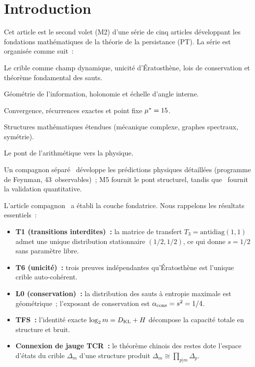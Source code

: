 \documentclass[12pt,a4paper]{article}
\begin{document}
\tableofcontents
\newpage

\section{Introduction}
\label{sec:intro}

Cet article est le second volet (M2) d'une série de cinq articles
développant les fondations mathématiques de la théorie de la
persistance (PT). La série est organisée comme suit~:
\begin{description}[nosep]
\item[M1~\cite{companion_M1}~:] Le crible comme champ dynamique,
  unicité d'Ératosthène, lois de conservation et théorème fondamental
  des sauts.
\item[M2 (cet article)~:] Géométrie de l'information, holonomie et
  échelle d'angle interne.
\item[M3~\cite{companion_M3}~:] Convergence, récurrences exactes et
  point fixe ${\mu^{*}} = 15$.
\item[M4~\cite{companion_M4}~:] Structures mathématiques étendues
  (mécanique complexe, graphes spectraux, symétrie).
\item[M5~\cite{companion_M5}~:] Le pont de l'arithmétique vers la
  physique.
\end{description}
\noindent
Un compagnon séparé~\cite{companion_physics} développe les prédictions
physiques détaillées (programme de Feynman, 43~observables)~; M5
fournit le pont structurel, tandis que~\cite{companion_physics} fournit
la validation quantitative.

L'article compagnon~\cite{companion_M1} a établi la couche fondatrice.
Nous rappelons les résultats essentiels~:
\begin{itemize}[nosep]
\item \textbf{T1 (transitions interdites)~:} la matrice de transfert
  $T_3 = \mathrm{antidiag}(1,1)$ admet une unique distribution
  stationnaire $(1/2, 1/2)$, ce qui donne $s = 1/2$ sans paramètre
  libre.
\item \textbf{T6 (unicité)~:} trois preuves indépendantes qu'Ératosthène
  est l'unique crible auto-cohérent.
\item \textbf{L0 (conservation)~:} la distribution des sauts à entropie
  maximale est géométrique~; l'exposant de conservation est
  $\alpha_{\rm cons} = s^2 = 1/4$.
\item \textbf{TFS~:} l'identité exacte $\log_2 m = D_{\mathrm{KL}} + H$ décompose
  la capacité totale en structure et bruit.
\item \textbf{Connexion de jauge TCR~:} le théorème chinois des restes
  dote l'espace d'états du crible $\Delta_m$ d'une structure produit
  $\Delta_m \cong \prod_{p|m} \Delta_p$.
\end{itemize}
\end{document}
